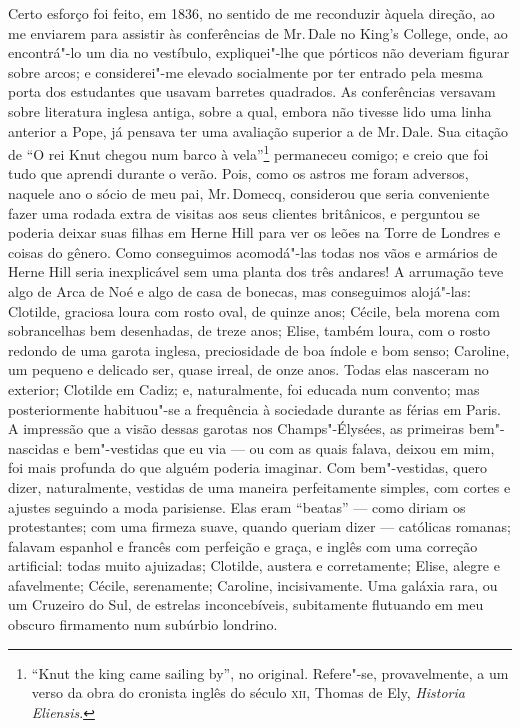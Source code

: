 Certo esforço foi feito, em 1836, no sentido de me reconduzir
àquela direção, ao me enviarem para assistir às conferências de Mr.\,Dale
no King's College, onde, ao encontrá"-lo um dia no vestíbulo,
expliquei"-lhe que pórticos não deveriam figurar sobre arcos; e
considerei"-me elevado socialmente por ter entrado pela mesma porta dos
estudantes que usavam barretes quadrados. As conferências versavam sobre
literatura inglesa antiga, sobre a qual, embora não tivesse lido uma
linha anterior a Pope, já pensava ter uma avaliação superior a de Mr.\,Dale. Sua citação de ``O rei Knut chegou num barco à vela''\footnote{``Knut
  the king came sailing by'', no original. Refere"-se, provavelmente, a
  um verso da obra do cronista inglês do século \textsc{xii}, Thomas de Ely,
  \textit{Historia Eliensis}.} permaneceu comigo; e creio
que foi tudo que aprendi durante o verão. Pois, como os astros me foram
adversos, naquele ano o sócio de meu pai, Mr.\,Domecq, considerou que
seria conveniente fazer uma rodada extra de visitas aos seus clientes
britânicos, e perguntou se poderia deixar suas filhas em Herne Hill para
ver os leões na Torre de Londres e coisas do gênero. Como conseguimos
acomodá"-las todas nos vãos e armários de Herne Hill seria inexplicável
sem uma planta dos três andares! A arrumação teve algo de Arca de Noé e
algo de casa de bonecas, mas conseguimos alojá"-las: Clotilde, graciosa
loura com rosto oval, de quinze anos; Cécile, bela morena com
sobrancelhas bem desenhadas, de treze anos; Elise, também loura, com o
rosto redondo de uma garota inglesa, preciosidade de boa índole e bom
senso; Caroline, um pequeno e delicado ser, quase irreal, de onze anos.
Todas elas nasceram no exterior; Clotilde em Cadiz; e, naturalmente, foi
educada num convento; mas posteriormente habituou"-se a frequência à
sociedade durante as férias em Paris. A impressão que a visão dessas
garotas nos Champs"-Élysées, as primeiras bem"-nascidas e bem"-vestidas que
eu via --- ou com as quais falava, deixou em mim, foi mais profunda do
que alguém poderia imaginar. Com bem"-vestidas, quero dizer,
naturalmente, vestidas de uma maneira perfeitamente simples, com cortes
e ajustes seguindo a moda parisiense. Elas eram ``beatas'' --- como
diriam os protestantes; com uma firmeza suave, quando queriam dizer ---
católicas romanas; falavam espanhol e francês com perfeição e graça, e
inglês com uma correção artificial: todas muito ajuizadas; Clotilde,
austera e corretamente; Elise, alegre e afavelmente; Cécile,
serenamente; Caroline, incisivamente. Uma galáxia rara, ou um Cruzeiro
do Sul, de estrelas inconcebíveis, subitamente flutuando em meu obscuro
firmamento num subúrbio londrino.

